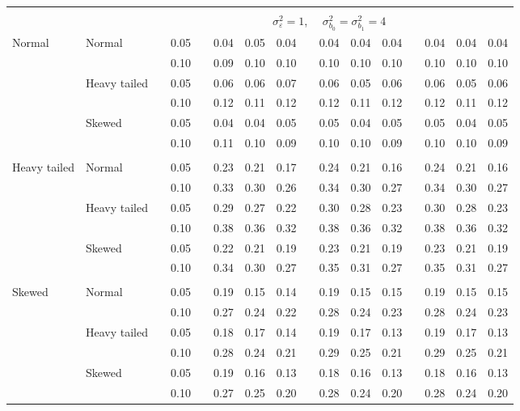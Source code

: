 \documentclass{article} %
\begin{document}
\begin{table}[ht]
\begin{scriptsize}
\begin{center}
\begin{tabular}{ll p{.1cm} c p{.1cm} rrr p{.1cm} rrr p{.1cm} rrr}
&&&&&&&&&&&&&&&\\
& && && \multicolumn{9}{c}{$\sigma_{\varepsilon}^2 = 1$, \ \ $\sigma_{b_0}^2 = \sigma_{b_1}^2 = 4$} \\ \cline{6-16}
\rowcolor{gray!20}Normal       & Normal       && 0.05 &&   0.04 & 0.05 & 0.04 && 0.04 & 0.04 & 0.04 && 0.04 & 0.04 & 0.04 \\ 
\rowcolor{gray!20}             &              && 0.10 &&   0.09 & 0.10 & 0.10 && 0.10 & 0.10 & 0.10 && 0.10 & 0.10 & 0.10 \\ 
\rowcolor{gray!20}             & Heavy tailed && 0.05 &&   0.06 & 0.06 & 0.07 && 0.06 & 0.05 & 0.06 && 0.06 & 0.05 & 0.06 \\ 
\rowcolor{gray!20}             &              && 0.10 &&   0.12 & 0.11 & 0.12 && 0.12 & 0.11 & 0.12 && 0.12 & 0.11 & 0.12 \\ 
\rowcolor{gray!20}             & Skewed       && 0.05 &&   0.04 & 0.04 & 0.05 && 0.05 & 0.04 & 0.05 && 0.05 & 0.04 & 0.05 \\ 
\rowcolor{gray!20}             &              && 0.10 &&   0.11 & 0.10 & 0.09 && 0.10 & 0.10 & 0.09 && 0.10 & 0.10 & 0.09 \\ 
             &&&&&&&&&&&&&&&\\
Heavy tailed & Normal       && 0.05 &&   0.23 & 0.21 & 0.17 && 0.24 & 0.21 & 0.16 && 0.24 & 0.21 & 0.16 \\ 
             &              && 0.10 &&   0.33 & 0.30 & 0.26 && 0.34 & 0.30 & 0.27 && 0.34 & 0.30 & 0.27 \\ 
             & Heavy tailed && 0.05 &&   0.29 & 0.27 & 0.22 && 0.30 & 0.28 & 0.23 && 0.30 & 0.28 & 0.23 \\ 
             &              && 0.10 &&   0.38 & 0.36 & 0.32 && 0.38 & 0.36 & 0.32 && 0.38 & 0.36 & 0.32 \\ 
             & Skewed       && 0.05 &&   0.22 & 0.21 & 0.19 && 0.23 & 0.21 & 0.19 && 0.23 & 0.21 & 0.19 \\ 
             &              && 0.10 &&   0.34 & 0.30 & 0.27 && 0.35 & 0.31 & 0.27 && 0.35 & 0.31 & 0.27 \\ 
             &&&&&&&&&&&&&&&\\
Skewed       & Normal       && 0.05 &&   0.19 & 0.15 & 0.14 && 0.19 & 0.15 & 0.15 && 0.19 & 0.15 & 0.15 \\ 
             &              && 0.10 &&   0.27 & 0.24 & 0.22 && 0.28 & 0.24 & 0.23 && 0.28 & 0.24 & 0.23 \\ 
             & Heavy tailed && 0.05 &&   0.18 & 0.17 & 0.14 && 0.19 & 0.17 & 0.13 && 0.19 & 0.17 & 0.13 \\ 
             &              && 0.10 &&   0.28 & 0.24 & 0.21 && 0.29 & 0.25 & 0.21 && 0.29 & 0.25 & 0.21 \\ 
             & Skewed       && 0.05 &&   0.19 & 0.16 & 0.13 && 0.18 & 0.16 & 0.13 && 0.18 & 0.16 & 0.13 \\ 
             &              && 0.10 &&   0.27 & 0.25 & 0.20 && 0.28 & 0.24 & 0.20 && 0.28 & 0.24 & 0.20 \\ 



\end{tabular}
\end{center}
\end{scriptsize}
\end{table}
\end{document}

